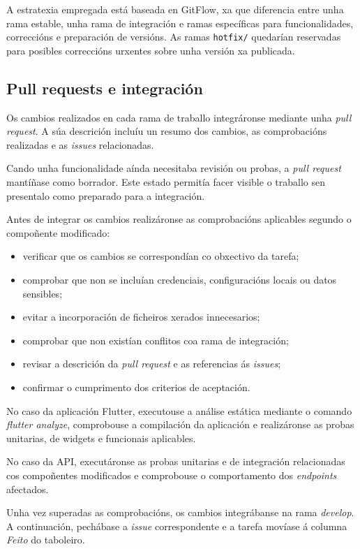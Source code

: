 A estratexia empregada está baseada en GitFlow, xa que diferencia entre unha rama estable, unha rama de integración e ramas específicas para funcionalidades, correccións e preparación de versións. As ramas \texttt{hotfix/} quedarían reservadas para posibles correccións urxentes sobre unha versión xa publicada.

\subsection{Pull requests e integración}

Os cambios realizados en cada rama de traballo integráronse mediante unha \textit{pull request}. A súa descrición incluíu un resumo dos cambios, as comprobacións realizadas e as \textit{issues} relacionadas.

Cando unha funcionalidade aínda necesitaba revisión ou probas, a \textit{pull request} mantíñase como borrador. Este estado permitía facer visible o traballo sen presentalo como preparado para a integración.

Antes de integrar os cambios realizáronse as comprobacións aplicables segundo o compoñente modificado:

\begin{itemize}
    \item verificar que os cambios se correspondían co obxectivo da tarefa;
    \item comprobar que non se incluían credenciais, configuracións locais ou datos sensibles;
    \item evitar a incorporación de ficheiros xerados innecesarios;
    \item comprobar que non existían conflitos coa rama de integración;
    \item revisar a descrición da \textit{pull request} e as referencias ás \textit{issues};
    \item confirmar o cumprimento dos criterios de aceptación.
\end{itemize}

No caso da aplicación Flutter, executouse a análise estática mediante o comando \textit{flutter analyze}, comprobouse a compilación da aplicación e realizáronse as probas unitarias, de widgets e funcionais aplicables.

No caso da API, executáronse as probas unitarias e de integración relacionadas cos compoñentes modificados e comprobouse o comportamento dos \textit{endpoints} afectados.

Unha vez superadas as comprobacións, os cambios integrábanse na rama \textit{develop}. A continuación, pechábase a \textit{issue} correspondente e a tarefa movíase á columna \textit{Feito} do taboleiro.

